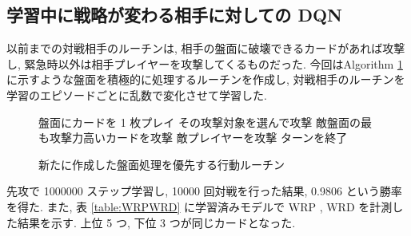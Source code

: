 \documentclass{jarticle}     %
\begin{document}
\subsection{学習中に戦略が変わる相手に対しての DQN }
以前までの対戦相手のルーチンは, 相手の盤面に破壊できるカードがあれば攻撃し, 緊急時以外は相手プレイヤーを攻撃してくるものだった. 今回はAlgorithm \ref{alg1} に示すような盤面を積極的に処理するルーチンを作成し, 対戦相手のルーチンを学習のエピソードごとに乱数で変化させて学習した.
\begin{figure}[t]
  \vspace{-0.3cm}
  \begin{algorithm}[H]
      \caption{
        新たに作成した盤面処理を優先する行動ルーチン
        }
      \label{alg1}
      \begin{algorithmic}[1] 
      \STATE 盤面にカードを 1 枚プレイ
      \STATE その攻撃対象を選んで攻撃
      \ELSE
      \STATE 敵盤面の最も攻撃力高いカードを攻撃
      \ELSE
      \STATE 敵プレイヤーを攻撃
      \ENDIF
      \ENDIF
      \ENDFOR
      \STATE ターンを終了
      \end{algorithmic}
  \end{algorithm}
  \vspace{-0.3cm}
  \end{figure}
先攻で 1000000 ステップ学習し, 10000 回対戦を行った結果, 0.9806 という勝率を得た.
また, 表 \ref{table:WRPWRD} に学習済みモデルで WRP , WRD を計測した結果を示す.
上位 5 つ, 下位 3 つが同じカードとなった.
\end{document}
